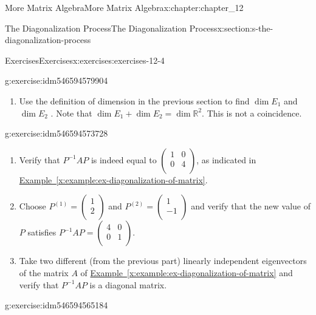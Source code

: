 \documentclass[oneside,10pt,]{book}
\newcommand{\xreffont}{\relax}
\numberwithin{equation}{section}
\begin{document}
\begin{chapterptx}{More Matrix Algebra}{}{More Matrix Algebra}{}{}{x:chapter:chapter_12}
\begin{sectionptx}{The Diagonalization Process}{}{The Diagonalization Process}{}{}{x:section:s-the-diagonalization-process}
\begin{exercises-subsection}{Exercises}{}{Exercises}{}{}{x:exercises:exercises-12-4}
\begin{divisionexercise}{2}{}{}{g:exercise:idm546594579904}
\begin{enumerate}[label=(\alph*)]
\item{}Use the definition of dimension in the previous section to find \(\dim E_1\) and \(\dim  E_2\) . Note that \(\dim E_1 + \dim E_2 = \dim \mathbb{R}^2\). This is not a coincidence.%
\end{enumerate}
%
\end{divisionexercise}%
\begin{divisionexercise}{3}{}{}{g:exercise:idm546594573728}%
%
\begin{enumerate}[label=(\alph*)]
\item{}Verify that \(P^{-1} A P\) is indeed equal to \(\left(
\begin{array}{cc}
1 & 0 \\
0 & 4 \\
\end{array}
\right)\),  as indicated in \hyperref[x:example:ex-diagonalization-of-matrix]{Example~{\xreffont\ref{x:example:ex-diagonalization-of-matrix}}}.%
\item{}Choose \(P^{(1)}=\left(
\begin{array}{c}
1 \\
2 \\
\end{array}
\right)\) and \(P^{(2)}=\left(
\begin{array}{c}
1 \\
-1 \\
\end{array}
\right)\) and verify that the new value of \(P\) satisfies \(P^{-1} A P=\left(
\begin{array}{cc}
4 & 0 \\
0 & 1 \\
\end{array}
\right)\).%
\item{}Take two different (from the previous part) linearly independent eigenvectors of the matrix \(A\) of \hyperref[x:example:ex-diagonalization-of-matrix]{Example~{\xreffont\ref{x:example:ex-diagonalization-of-matrix}}} and verify that \(P^{-1} A P\) is a diagonal matrix.%
\end{enumerate}
%
\end{divisionexercise}%
\begin{divisionexercise}{4}{}{}{g:exercise:idm546594565184}%
%
\end{divisionexercise}
\end{exercises-subsection}
\end{sectionptx}
\end{chapterptx}
\end{document}
